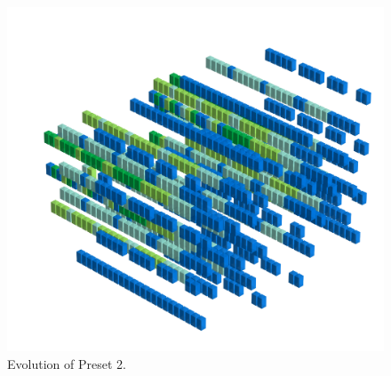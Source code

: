 \clearpage                                                                 
\begin{figure}[H]                                                          
  \centering                                                             
  \begin{adjustbox}{width=14cm,center}                                   
  \includegraphics[width=14cm]{src/presets/pattern2-45.png}%
  \end{adjustbox}                                                        
\caption{Evolution of Preset 2.}                                           
\end{figure}                                                               
\clearpage                                                                 
                                                                           
